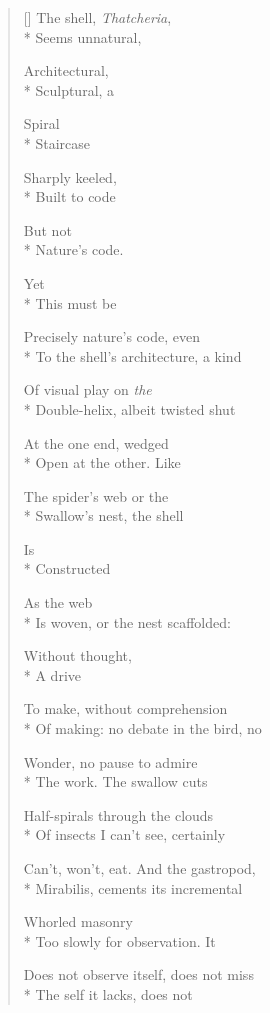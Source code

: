 \label{ch:thatcheria_mirabilis}
\settowidth{\versewidth}{Can't, won't, eat. \qquad And the gastropod,}
\begin{verse}[\versewidth]
The shell, \textit{Thatcheria},\\*
Seems unnatural,

Architectural,\\*
Sculptural, a

Spiral\\*
 \qquad Staircase

 \qquad Sharply keeled,\\*
Built to code

 \qquad But not\\*
Nature's code.

 \qquad \qquad  \qquad Yet\\*
This must be

Precisely nature's code, even\\*
To the shell's architecture, a kind

Of visual play on \textit{the}\\*
Double-helix, albeit twisted shut

At the one end, wedged\\*
Open at the other. \qquad Like

The spider's web or the \\*
Swallow's nest, the shell

Is\\*
Constructed

As the web\\*
Is woven, or the nest scaffolded:

Without thought,\\*
 \qquad  \qquad A drive

To make, without comprehension\\*
Of making: no debate in the bird, no

Wonder, no pause to admire\\*
The work.  The swallow cuts

Half-spirals through the clouds\\*
Of insects I can't see, certainly

Can't, won't, eat. \qquad And the gastropod,\\*
Mirabilis, cements its incremental

Whorled masonry\\*
Too slowly for observation. \qquad It

Does not observe itself, does not miss\\*
The self it lacks, does not


\end{verse}
